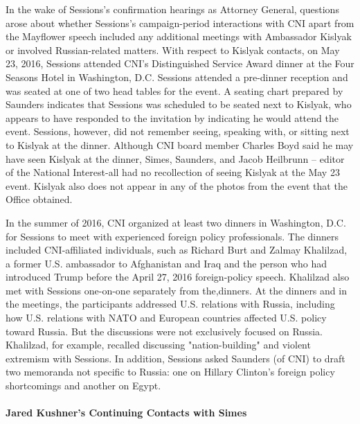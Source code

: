 In the wake of Sessions's confirmation hearings as Attorney General, questions arose about whether Sessions's campaign-period interactions with CNI apart from the Mayflower speech included any additional meetings with Ambassador Kislyak or involved Russian-related matters.
With respect to Kislyak contacts, on May 23, 2016, Sessions attended CNI's Distinguished Service Award dinner at the Four Seasons Hotel in Washington, D.C.%
Sessions attended a pre-dinner reception and was seated at one of two head tables for the event.%
A seating chart prepared by Saunders indicates that Sessions was scheduled to be seated next to Kislyak, who appears to have responded to the invitation by indicating he would attend the event.%
Sessions, however, did not remember seeing, speaking with, or sitting next to Kislyak at the dinner.%
Although CNI board member Charles Boyd said he may have seen Kislyak at the dinner,%
Simes, Saunders, and Jacob Heilbrunn -- editor of the National Interest-all had no recollection of seeing Kislyak at the May 23 event.%
Kislyak also does not appear in any of the photos from the event that the Office obtained.

In the summer of 2016, CNI organized at least two dinners in Washington, D.C. for Sessions to meet with experienced foreign policy professionals.%
The dinners included CNI-affiliated individuals, such as Richard Burt and Zalmay Khalilzad, a former U.S. ambassador to Afghanistan and Iraq and the person who had introduced Trump before the April 27, 2016 foreign-policy speech.%
Khalilzad also met with Sessions one-on-one separately from the,dinners.%
At the dinners and in the meetings, the participants addressed U.S. relations with Russia, including how U.S. relations with NATO and European countries affected U.S. policy toward Russia.%
But the discussions were not exclusively focused on Russia.%
Khalilzad, for example, recalled discussing "nation-building" and violent extremism with Sessions.%
In addition, Sessions asked Saunders (of CNI) to draft two memoranda not specific to Russia: one on Hillary Clinton's foreign policy shortcomings and another on Egypt.%

\paragraph{Jared Kushner's Continuing Contacts with Simes}

